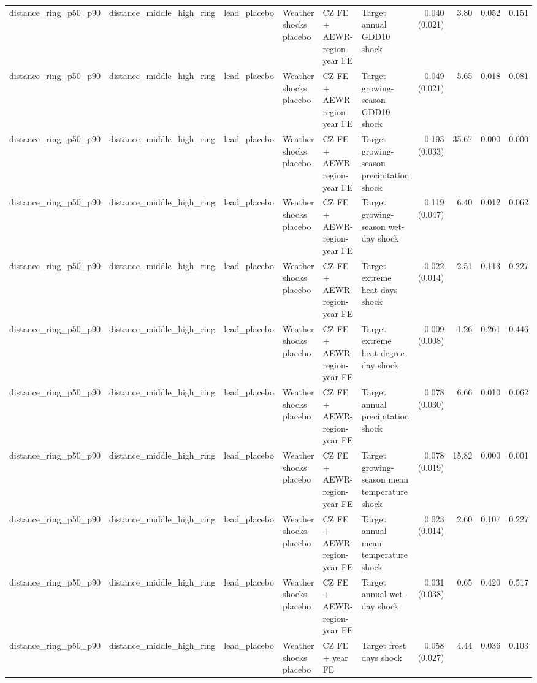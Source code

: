 \begin{tabular}{llllllrrrr}
distance_ring_p50_p90 & distance_middle_high_ring & lead_placebo & Weather shocks placebo & CZ FE + AEWR-region-year FE & Target annual GDD10 shock & 0.040 (0.021) & 3.80 & 0.052 & 0.151 \\
distance_ring_p50_p90 & distance_middle_high_ring & lead_placebo & Weather shocks placebo & CZ FE + AEWR-region-year FE & Target growing-season GDD10 shock & 0.049 (0.021) & 5.65 & 0.018 & 0.081 \\
distance_ring_p50_p90 & distance_middle_high_ring & lead_placebo & Weather shocks placebo & CZ FE + AEWR-region-year FE & Target growing-season precipitation shock & 0.195 (0.033) & 35.67 & 0.000 & 0.000 \\
distance_ring_p50_p90 & distance_middle_high_ring & lead_placebo & Weather shocks placebo & CZ FE + AEWR-region-year FE & Target growing-season wet-day shock & 0.119 (0.047) & 6.40 & 0.012 & 0.062 \\
distance_ring_p50_p90 & distance_middle_high_ring & lead_placebo & Weather shocks placebo & CZ FE + AEWR-region-year FE & Target extreme heat days shock & -0.022 (0.014) & 2.51 & 0.113 & 0.227 \\
distance_ring_p50_p90 & distance_middle_high_ring & lead_placebo & Weather shocks placebo & CZ FE + AEWR-region-year FE & Target extreme heat degree-day shock & -0.009 (0.008) & 1.26 & 0.261 & 0.446 \\
distance_ring_p50_p90 & distance_middle_high_ring & lead_placebo & Weather shocks placebo & CZ FE + AEWR-region-year FE & Target annual precipitation shock & 0.078 (0.030) & 6.66 & 0.010 & 0.062 \\
distance_ring_p50_p90 & distance_middle_high_ring & lead_placebo & Weather shocks placebo & CZ FE + AEWR-region-year FE & Target growing-season mean temperature shock & 0.078 (0.019) & 15.82 & 0.000 & 0.001 \\
distance_ring_p50_p90 & distance_middle_high_ring & lead_placebo & Weather shocks placebo & CZ FE + AEWR-region-year FE & Target annual mean temperature shock & 0.023 (0.014) & 2.60 & 0.107 & 0.227 \\
distance_ring_p50_p90 & distance_middle_high_ring & lead_placebo & Weather shocks placebo & CZ FE + AEWR-region-year FE & Target annual wet-day shock & 0.031 (0.038) & 0.65 & 0.420 & 0.517 \\
distance_ring_p50_p90 & distance_middle_high_ring & lead_placebo & Weather shocks placebo & CZ FE + year FE & Target frost days shock & 0.058 (0.027) & 4.44 & 0.036 & 0.103 \\

\end{tabular}
